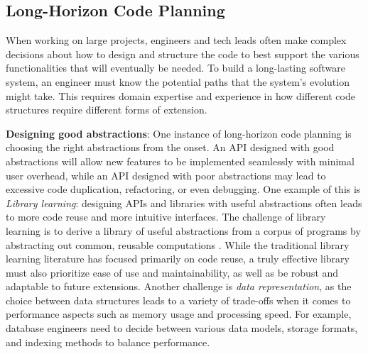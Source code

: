 
\vspace{-0.2cm}

\subsection{Long-Horizon Code Planning}

\vspace{-0.1cm}

When working on large projects, engineers and tech leads often make complex decisions about how to design and structure the code to best support the various functionalities that will eventually be needed. To build a long-lasting software system, an engineer must know the potential paths that the system's evolution might take. This requires domain expertise and experience in how different code structures require different forms of extension. 

\textbf{Designing good abstractions}:
One instance of long-horizon code planning is choosing the right abstractions from the onset. An API designed with good abstractions will allow new features to be implemented seamlessly with minimal user overhead, while an API designed with poor abstractions may lead to excessive code duplication, refactoring, or even debugging. One example of this is \textit{Library learning}: designing APIs and libraries with useful abstractions often leads to more code reuse and more intuitive interfaces. The challenge of library learning is to derive a library of useful abstractions from a corpus of programs by abstracting out common, reusable computations \cite{ellis2021dreamcoder,10.5555/3692070.3693967}. While the traditional library learning literature has focused primarily on code reuse, a truly effective library must also prioritize ease of use and maintainability, as well as be robust and adaptable to future extensions. %
Another challenge is \textit{data representation}, as the choice between data structures leads to a variety of trade-offs when it comes to performance aspects such as memory usage and processing speed. For example, database engineers need to decide between various data models, storage formats, and indexing methods to balance performance. 

